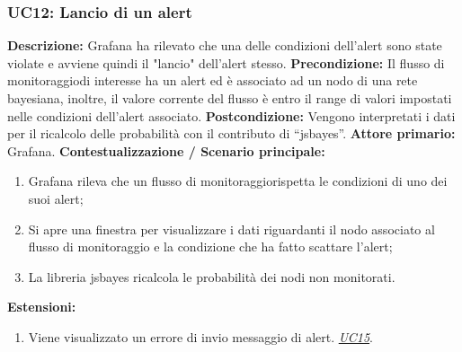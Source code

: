 		        \subsubsection{UC12: Lancio di un alert}
                    \textbf{Descrizione:} Grafana ha rilevato che una delle condizioni dell'alert sono state violate e avviene quindi il "lancio" dell'alert stesso.
                    \newline
                    \textbf{Precondizione:} Il flusso di monitoraggio\pedice di interesse ha un alert ed è associato ad un nodo di una rete bayesiana, inoltre, il valore corrente del flusso è entro il range di valori impostati nelle condizioni dell'alert associato.
                    \newline
                    \textbf{Postcondizione:} Vengono interpretati i dati per il ricalcolo delle probabilità con il contributo di “jsbayes”.
                    \newline
                    \textbf{Attore primario:} Grafana.
                    \newline
                    \textbf{Contestualizzazione / Scenario principale:} \begin{enumerate}
                            \item Grafana rileva che un flusso di monitoraggio\pedice rispetta le condizioni di uno dei suoi alert;
                            \item Si apre una finestra per visualizzare i dati riguardanti il nodo associato al flusso di monitoraggio e la condizione che ha fatto scattare l'alert;
                            \item La libreria jsbayes ricalcola le probabilità dei nodi non monitorati.
                        \end{enumerate}
                    
                    \textbf{Estensioni:} 
                    \begin{enumerate}
                        \item Viene visualizzato un errore di invio messaggio di alert. \underline{\textit{UC15}}.
                    \end{enumerate}
                    
                      
                      
